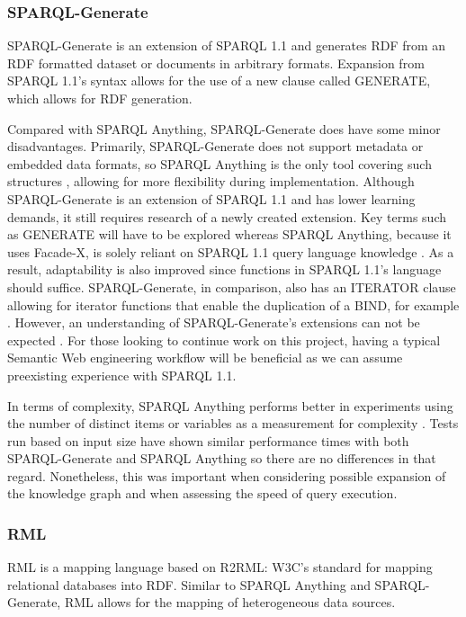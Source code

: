 \subsubsection{SPARQL-Generate}
\hspace{0.5cm} SPARQL-Generate is an extension of SPARQL 1.1 and generates RDF from an RDF formatted dataset or documents in arbitrary formats. Expansion from SPARQL 1.1's syntax allows for the use of a new clause called GENERATE, which allows for RDF generation. \cite{lefranccois2017sparql}

Compared with SPARQL Anything, SPARQL-Generate does have some minor disadvantages. Primarily, SPARQL-Generate does not support metadata or embedded data formats, so SPARQL Anything is the only tool covering such structures \cite{sparqlanything}, allowing for more flexibility during implementation. Although SPARQL-Generate is an extension of SPARQL 1.1 and has lower learning demands, it still requires research of a newly created extension. Key terms such as GENERATE will have to be explored whereas SPARQL Anything, because it uses Facade-X, is solely reliant on SPARQL 1.1 query language knowledge \cite{sparqlanything}. As a result, adaptability is also improved since functions in SPARQL 1.1's language should suffice. SPARQL-Generate, in comparison, also has an ITERATOR clause allowing for iterator functions that enable the duplication of a BIND, for example \cite{lefranccois2017sparql}. However, an understanding of SPARQL-Generate's extensions can not be expected \cite{sparqlanything}. For those looking to continue work on this project, having a typical Semantic Web engineering workflow will be beneficial as we can assume preexisting experience with SPARQL 1.1. 

In terms of complexity, SPARQL Anything performs better in experiments using the number of distinct items or variables as a measurement for complexity \cite{sparqlanything}. Tests run based on input size have shown similar performance times with both SPARQL-Generate and SPARQL Anything so there are no differences in that regard. Nonetheless, this was important when considering possible expansion of the knowledge graph and when assessing the speed of query execution. 

\subsubsection{RML}
\hspace{0.5cm} RML is a mapping language based on R2RML: W3C's standard for mapping relational databases into RDF. Similar to SPARQL Anything and SPARQL-Generate, RML allows for the mapping of heterogeneous data sources. \cite{dimou2014rml} 

